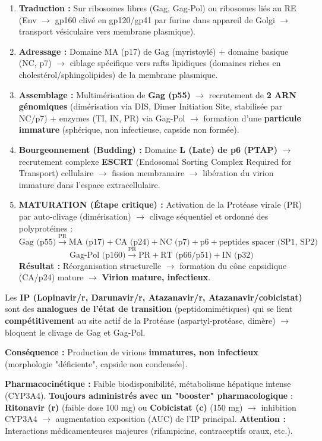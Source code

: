 \documentclass[11pt]{article}
\newcommand{\cle}[1]{{\popxbold\color{popdark}#1}}
\begin{document}
\begin{enumerate}
    \item \textbf{Traduction :} Sur ribosomes libres (Gag, Gag-Pol) ou ribosomes liés au RE (Env $\to$ gp160 clivé en gp120/gp41 par furine dans appareil de Golgi $\to$ transport vésiculaire vers membrane plasmique).
    \item \textbf{Adressage :} Domaine MA (p17) de Gag (myristoylé) + domaine basique (NC, p7) $\to$ ciblage spécifique vers \cle{rafts lipidiques} (domaines riches en cholestérol/sphingolipides) de la membrane plasmique.
    \item \textbf{Assemblage :} Multimérisation de \textbf{Gag (p55)} $\to$ recrutement de \textbf{2 ARN génomiques} (dimérisation via DIS, Dimer Initiation Site, stabilisée par NC/p7) + enzymes (TI, IN, PR) via Gag-Pol $\to$ formation d'une \textbf{particule immature} (sphérique, non infectieuse, capside non formée).
    \item \textbf{Bourgeonnement (Budding) :} Domaine \textbf{L (Late) de p6 (PTAP)} $\to$ recrutement complexe \textbf{ESCRT} (Endosomal Sorting Complex Required for Transport) cellulaire $\to$ fission membranaire $\to$ libération du virion immature dans l'espace extracellulaire.
    \item \textbf{MATURATION (Étape critique) :} Activation de la \cle{Protéase virale (PR)} par auto-clivage (dimérisation) $\to$ clivage séquentiel et ordonné des polyprotéines :
    \[
    \text{Gag (p55)} \xrightarrow{\text{PR}} \text{MA (p17)} + \text{CA (p24)} + \text{NC (p7)} + \text{p6} + \text{peptides spacer (SP1, SP2)}
    \]
    \[
    \text{Gag-Pol (p160)} \xrightarrow{\text{PR}} \text{PR} + \text{RT (p66/p51)} + \text{IN (p32)}
    \]
    \textbf{Résultat :} Réorganisation structurelle $\to$ formation du \cle{cône capsidique} (CA/p24) mature $\to$ \textbf{Virion mature, infectieux}.
\end{enumerate}

\begin{propriete}
Les \textbf{IP (Lopinavir/r, Darunavir/r, Atazanavir/r, Atazanavir/cobicistat)} sont des \textbf{analogues de l'état de transition} (peptidomimétiques) qui se lient \textbf{compétitivement} au site actif de la Protéase (aspartyl-protéase, dimère) $\to$ bloquent le clivage de Gag et Gag-Pol.
\par \textbf{Conséquence :} Production de virions \textbf{immatures, non infectieux} (morphologie "déficiente", capside non condensée).
\par \textbf{Pharmacocinétique :} Faible biodisponibilité, métabolisme hépatique intense (CYP3A4). \textbf{Toujours administrés avec un "booster" pharmacologique} : \textbf{Ritonavir (r)} (faible dose 100 mg) ou \textbf{Cobicistat (c)} (150 mg) $\to$ inhibition CYP3A4 $\to$ augmentation exposition (AUC) de l'IP principal. \textbf{Attention :} Interactions médicamenteuses majeures (rifampicine, contraceptifs oraux, etc.).
\end{propriete}
\end{document}
